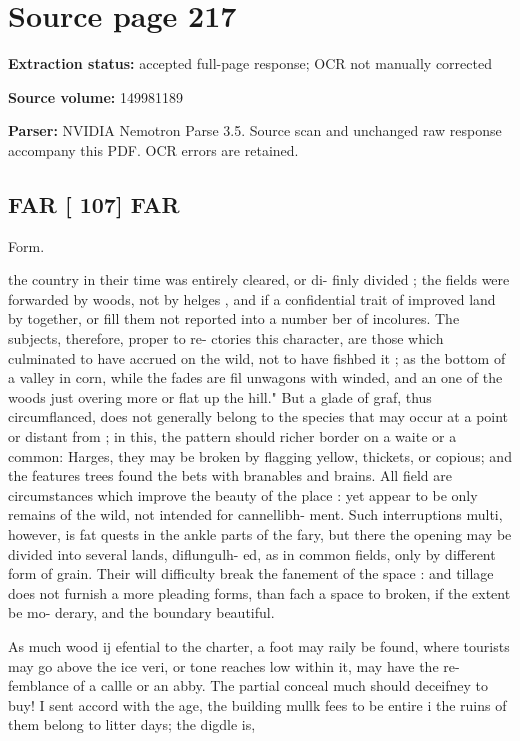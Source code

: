 \clearpage
\section{Source page 217}
\textbf{Extraction status:} accepted full-page response; OCR not manually corrected\par
\textbf{Source volume:} 149981189\par
\textbf{Parser:} NVIDIA Nemotron Parse 3.5. Source scan and unchanged raw response accompany this PDF. OCR errors are retained.\par\medskip
\subsection*{FAR [ 107] FAR}
Form.\par\medskip
the country in their time was entirely cleared, or di-
finly divided ; the fields were forwarded by woods,
not by helges , and if a confidential trait of improved
land by together, or fill them not reported into a number
ber of incolures. The subjects, therefore, proper to re-
ctories this character, are those which culminated
to have accrued on the wild, not to have fishbed
it ; as the bottom of a valley in corn, while the fades
are fil unwagons with winded, and an one of the
woods just overing more or flat up
the hill." But a glade of graf, thus circumflanced,
does not generally belong to the species that may
occur at a point or distant from ; in this, the pattern
should richer border on a waite or a common: Harges,
they may be broken by flagging yellow, thickets, or
copious; and the features trees found the bets with
branables and brains. All field are circumstances
which improve the beauty of the place : yet appear to
be only remains of the wild, not intended for cannellibh-
ment. Such interruptions multi, however, is fat
quests in the ankle parts of the fary, but
there the opening may be divided into several lands, diflungulh-
ed, as in common fields, only by different form of grain.
Their will difficulty break the fanement of
the space : and tillage does not furnish a more pleading
forms, than fach a space to broken, if the extent be mo-
derary, and the boundary beautiful.\par\medskip
As much wood ij efential to the charter, a foot
may raily be found, where tourists may go above the ice
veri, or tone reaches low within it, may have the re-
femblance of a callle or an abby. The partial conceal
much should deceifney to buy! I sent accord with
the age, the building mullk fees to be entire i the
ruins of them belong to litter days; the digdle is,

